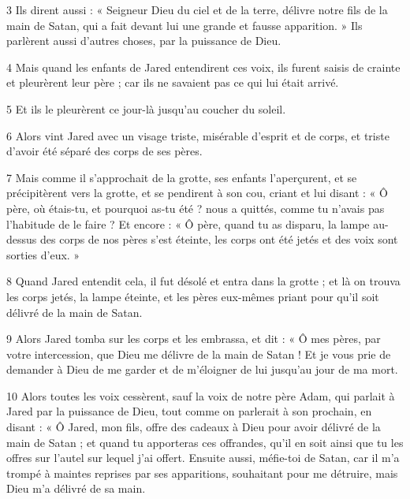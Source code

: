 \par 3 Ils dirent aussi : « Seigneur Dieu du ciel et de la terre, délivre notre fils de la main de Satan, qui a fait devant lui une grande et fausse apparition. » Ils parlèrent aussi d'autres choses, par la puissance de Dieu.

\par 4 Mais quand les enfants de Jared entendirent ces voix, ils furent saisis de crainte et pleurèrent leur père ; car ils ne savaient pas ce qui lui était arrivé.

\par 5 Et ils le pleurèrent ce jour-là jusqu'au coucher du soleil.

\par 6 Alors vint Jared avec un visage triste, misérable d'esprit et de corps, et triste d'avoir été séparé des corps de ses pères.

\par 7 Mais comme il s'approchait de la grotte, ses enfants l'aperçurent, et se précipitèrent vers la grotte, et se pendirent à son cou, criant et lui disant : « Ô père, où étais-tu, et pourquoi as-tu été ? nous a quittés, comme tu n’avais pas l’habitude de le faire ? Et encore : « Ô père, quand tu as disparu, la lampe au-dessus des corps de nos pères s'est éteinte, les corps ont été jetés et des voix sont sorties d'eux. »

\par 8 Quand Jared entendit cela, il fut désolé et entra dans la grotte ; et là on trouva les corps jetés, la lampe éteinte, et les pères eux-mêmes priant pour qu'il soit délivré de la main de Satan.

\par 9 Alors Jared tomba sur les corps et les embrassa, et dit : « Ô mes pères, par votre intercession, que Dieu me délivre de la main de Satan ! Et je vous prie de demander à Dieu de me garder et de m'éloigner de lui jusqu'au jour de ma mort.

\par 10 Alors toutes les voix cessèrent, sauf la voix de notre père Adam, qui parlait à Jared par la puissance de Dieu, tout comme on parlerait à son prochain, en disant : « Ô Jared, mon fils, offre des cadeaux à Dieu pour avoir délivré de la main de Satan ; et quand tu apporteras ces offrandes, qu'il en soit ainsi que tu les offres sur l'autel sur lequel j'ai offert. Ensuite aussi, méfie-toi de Satan, car il m'a trompé à maintes reprises par ses apparitions, souhaitant pour me détruire, mais Dieu m'a délivré de sa main.

